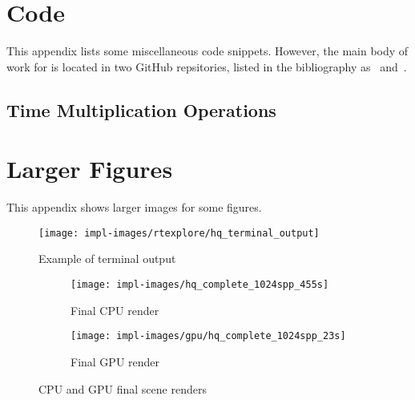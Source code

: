 %
%

\chapter{Code}\label{appendix:code}
This appendix lists some miscellaneous code snippets.
However, the main body of work for \name{} is located in two GitHub repsitories, listed in the bibliography as~\cite{raytermCpuImpl} and~\cite{raytermGpuImpl}.


\section{Time Multiplication Operations}\label{appendix:timemul}


\chapter{Larger Figures}\label{appendix:large_figures}
This appendix shows larger images for some figures.

\begin{figure}[htb]
  \centering
  \texttt{[image: impl-images/rtexplore/hq\_terminal\_output]}
  \caption{Example of terminal output}
\label{fig:terminal_output_large}
\end{figure}


\vspace{0.3em}
\begin{figure}[htb]
  \centering
  \begin{subfigure}[htb]{\textwidth}
  \texttt{[image: impl-images/hq\_complete\_1024spp\_455s]}
  \caption{Final CPU render}
\label{fig:rayterm-cpu_final_render_large}
  \end{subfigure}
  \begin{subfigure}[htb]{\textwidth}
      \texttt{[image: impl-images/gpu/hq\_complete\_1024spp\_23s]}
      \caption{Final GPU render}
\label{fig:rayterm-gpu_final_render_large}
  \end{subfigure}
  \caption{CPU and GPU final scene renders}
\label{fig:rayterm_final_ppm_outputs_large}
\end{figure}

